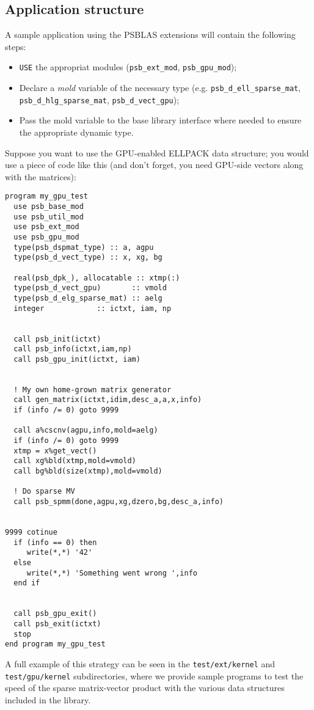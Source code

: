 \subsection{Application structure}
\label{sec:appstruct}
A sample application using the PSBLAS extensions will contain the
following steps:
\begin{itemize}
\item \verb|USE| the appropriat modules (\verb|psb_ext_mod|,
  \verb|psb_gpu_mod|);
\item Declare a \emph{mold} variable of the necessary type
  (e.g. \verb|psb_d_ell_sparse_mat|, \verb|psb_d_hlg_sparse_mat|,
  \verb|psb_d_vect_gpu|);
\item Pass the mold variable to the base library interface where
  needed to ensure the appropriate dynamic type.
\end{itemize}
Suppose you want to use the GPU-enabled ELLPACK data structure; you
would use a piece of code like this (and don't forget, you need
GPU-side vectors along with the matrices):
\lstset{language=Fortran}
\begin{lstlisting}
program my_gpu_test
  use psb_base_mod
  use psb_util_mod 
  use psb_ext_mod
  use psb_gpu_mod
  type(psb_dspmat_type) :: a, agpu
  type(psb_d_vect_type) :: x, xg, bg

  real(psb_dpk_), allocatable :: xtmp(:)
  type(psb_d_vect_gpu)       :: vmold
  type(psb_d_elg_sparse_mat) :: aelg
  integer            :: ictxt, iam, np


  call psb_init(ictxt)
  call psb_info(ictxt,iam,np)
  call psb_gpu_init(ictxt, iam)

  
  ! My own home-grown matrix generator
  call gen_matrix(ictxt,idim,desc_a,a,x,info)
  if (info /= 0) goto 9999

  call a%cscnv(agpu,info,mold=aelg)
  if (info /= 0) goto 9999
  xtmp = x%get_vect() 
  call xg%bld(xtmp,mold=vmold)
  call bg%bld(size(xtmp),mold=vmold)
  
  ! Do sparse MV
  call psb_spmm(done,agpu,xg,dzero,bg,desc_a,info)

 
9999 cotinue
  if (info == 0) then 
     write(*,*) '42'
  else
     write(*,*) 'Something went wrong ',info
  end if
  
  
  call psb_gpu_exit()
  call psb_exit(ictxt)
  stop
end program my_gpu_test
\end{lstlisting}
A full example of this strategy can be seen in the
\verb|test/ext/kernel| and \verb|test/gpu/kernel| subdirectories,
where we provide  sample programs 
to test the speed of the sparse matrix-vector product with the various
data structures included in the library. 





